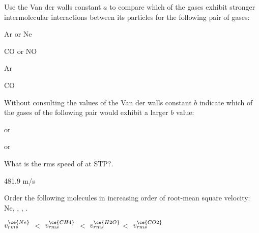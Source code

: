 \documentclass[main.tex]{subfiles}
\begin{document}
\begin{multicols*}{2}
\begin{question}[ID=\the\value{numA}]
Use the Van der walls constant $a$ to compare which of the gases exhibit stronger intermolecular interactions between its particles for the following pair of gases:
\begin{inparaenum}[(a)]	
\item  Ar or Ne
\item  CO or NO
\end{inparaenum} 
\end{question}
\begin{solution}
\begin{inparaenum}[(a)]	
\item   Ar
\item   CO
\end{inparaenum} 
\hspace{0.1cm}\end{solution}%


\begin{question}[ID=\the\value{numA}]
Without consulting the values of the Van der walls constant $b$ indicate which of the gases of  the following pair would exhibit a larger $b$ value:
\begin{inparaenum}[(a)]	
\item  {} or 
\item  {} or 
\end{inparaenum} 
\end{question}
\begin{solution}
\begin{inparaenum}[(a)]	
\item   {}
\item   {}
\end{inparaenum} 
\hspace{0.1cm}\end{solution}%


\begin{question}[ID=\the\value{numA}]
What is the rms speed of  at STP?.
\end{question}
\begin{solution}
481.9 m/s
\hspace{0.1cm}\end{solution}%
\begin{question}[ID=\the\value{numA}]
Order the following molecules in increasing order of root-mean square velocity: Ne, , , .
\end{question}
\begin{solution}
$v_{rms}^{\ce{Ne}}$ $<$ $v_{rms}^{\ce{CH4}}$ $<$ $v_{rms}^{\ce{H2O}}$$<$ $v_{rms}^{\ce{CO2}}$
\hspace{0.1cm}\end{solution}%




\end{multicols*}
\end{document}
